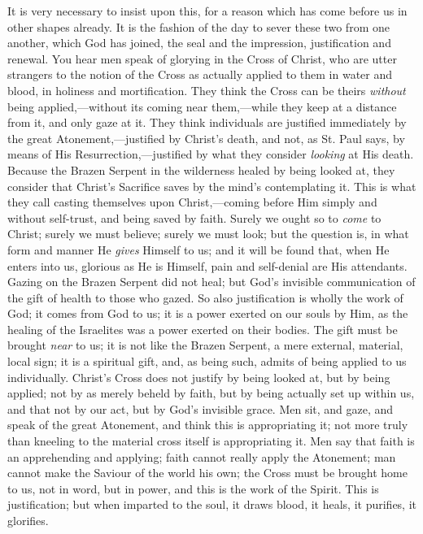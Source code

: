 It is very necessary to insist upon this, for a reason which has
come before us in other shapes already. It is the fashion of the day
to sever these two from one another, which God has joined, the seal
and the impression, justification and renewal. You hear men speak of
glorying in the Cross of Christ, who are utter strangers to the notion
of the Cross as actually applied to them in water and blood, in
holiness and mortification. They think the Cross can be theirs \emph{without}
being applied,—without its coming near them,—while they keep at a
distance from it, and only gaze at it. They think individuals are
justified immediately by the great Atonement,—justified by Christ's
death, and not, as St. Paul says, by means of His Resurrection,—justified
by what they consider \emph{looking} at His death. Because the Brazen
Serpent in the wilderness healed by being looked at, they
consider that Christ's Sacrifice saves by the mind's contemplating it.
This is what they call casting themselves upon Christ,—coming before
Him simply and without self-trust, and being saved by faith. Surely we
ought so to \emph{come} to Christ; surely we must believe; surely we
must look; but the question is, in what form and manner He \emph{gives}
Himself to us; and it will be found that, when He enters into us,
glorious as He is Himself, pain and self-denial are His attendants.
Gazing on the Brazen Serpent did not heal; but God's invisible
communication of the gift of health to those who gazed. So also
justification is wholly the work of God; it comes from God to us; it
is a power exerted on our souls by Him, as the healing of the
Israelites was a power exerted on their bodies. The gift must be
brought \emph{near} to us; it is not like the Brazen Serpent, a mere
external, material, local sign; it is a spiritual gift, and, as being
such, admits of being applied to us individually. Christ's Cross does
not justify by being looked at, but by being applied; not by as merely
beheld by faith, but by being actually set up within us, and that not
by our act, but by God's invisible grace. Men sit, and gaze, and speak
of the great Atonement, and think this is appropriating it; not more
truly than kneeling to the material cross itself is appropriating it.
Men say that faith is an apprehending and applying; faith cannot
really apply the Atonement; man cannot make the Saviour of the world
his own; the Cross must be brought home to us, not in word, but in
power, and this is the work of the Spirit. This is justification; but
when imparted to the soul, it draws blood, it heals, it purifies, it
glorifies.

